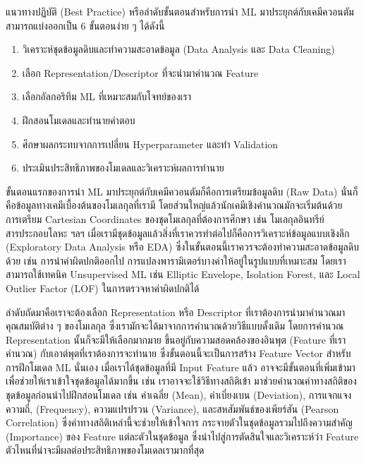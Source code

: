 แนวทางปฏิบัติ (Best Practice) หรือลำดับขั้นตอนสำหรับการนำ ML มาประยุกต์กับเคมีควอนตัมสามารถแบ่งออกเป็น 6 ขั้นตอนง่าย ๆ ได้ดังนี้

\begin{enumerate}
    \item วิเคราะห์ชุดข้อมูลดิบและทำความสะอาดข้อมูล (Data Analysis และ Data Cleaning)
    
    \item เลือก Representation/Descriptor ที่จะนำมาคำนวณ Feature 
    
    \item เลือกอัลกอริทึม ML ที่เหมาะสมกับโจทย์ของเรา 
    
    \item ฝึกสอนโมเดลและทำนายคำตอบ
    
    \item ศึกษาผลกระทบจากการเปลี่ยน Hyperparameter และทำ Validation
    
    \item ประเมินประสิทธิภาพของโมเดลและวิเคราะห์ผลการทำนาย
\end{enumerate}

ขั้นตอนแรกของการนำ ML มาประยุกต์กับเคมีควอนตัมก็คือการเตรียมข้อมูลดิบ (Raw Data) นั่นก็คือข้อมูลทางเคมีเบื้องต้นของโมเลกุลที่เรามี 
โดยส่วนใหญ่แล้วนักเคมีเชิงคำนวณมักจะเริ่มต้นด้วยการเตรียม Cartesian Coordinates ของชุดโมเลกุลที่ต้องการศึกษา เช่น โมเลกุลอินทรีย์
สารประกอบโลหะ ฯลฯ เมื่อเรามีชุดข้อมูลแล้วสิ่งที่เราควรทำต่อไปก็คือการวิเคราะห์ข้อมูลแบบเชิงลึก (Exploratory Data Analysis หรือ EDA) 
ซึ่งในขั้นตอนนี้เราควรจะต้องทำความสะอาดข้อมูลดิบด้วย เช่น การนำค่าผิดปกติออกไป การแปลงพารามิเตอร์บางค่าให้อยู่ในรูปแบบที่เหมาะสม 
โดยเราสามารถใช้เทคนิค Unsupervised ML เช่น Elliptic Envelope, Isolation Forest, และ Local Outlier Factor (LOF)
ในการตรวจหาค่าผิดปกติได้

ลำดับถัดมาคือเราจะต้องเลือก Representation หรือ Descriptor ที่เราต้องการนำมาคำนวณมาคุณสมบัติต่าง ๆ ของโมเลกุล 
ซึ่งเรามักจะได้มาจากการคำนวณด้วยวิธีแบบดั้งเดิม โดยการคำนวณ Representation นั้นก็จะมีให้เลือกมากมาย ขึ้นอยู่กับความสอดคล้องของอินพุต 
(Feature ที่เราคำนวณ) กับเอาต์พุตที่เราต้องการจะทำนาย ซึ่งขั้นตอนนี้จะเป็นการสร้าง Feature Vector สำหรับการฝึกโมเดล ML นั่นเอง 
เมื่อเราได้ชุดข้อมูลที่มี Input Feature แล้ว อาจจะมีขั้นตอนที่เพิ่มเข้ามาเพื่อช่วยให้เราเข้าใจชุดข้อมูลได้มากขึ้น เช่น เราอาจจะใช้วิธีทางสถิติเข้า%
มาช่วยคำนวณค่าทางสถิติของชุดข้อมูลก่อนนำไปฝึกสอนโมเดล เช่น ค่าเฉลี่ย (Mean), ค่าเบี่ยงเบน (Deviation), การแจกแจงความถี่, 
(Frequency), ความแปรปรวน (Variance), และสหสัมพันธ์ของเพียร์สัน (Pearson Correlation) ซึ่งค่าทางสถิติเหล่านี้จะช่วยให้เข้าใจการ%
กระจายตัวในชุดข้อมูลรวมไปถึงความสำคัญ (Importance) ของ Feature แต่ละตัวในชุดข้อมูล ซึ่งนำไปสู่การตัดสินใจและวิเคราะห์ว่า Feature 
ตัวไหนที่น่าจะมีผลต่อประสิทธิภาพของโมเดลเรามากที่สุด 

